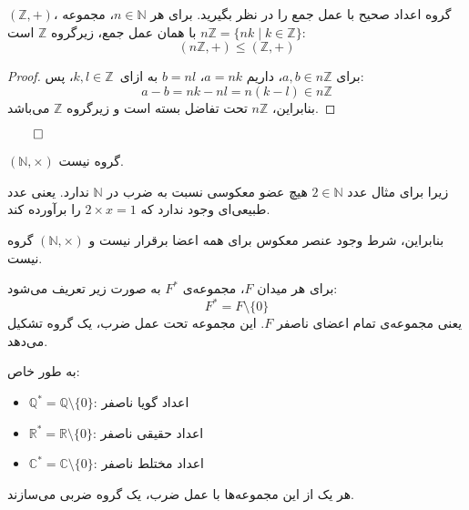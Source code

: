 \begin{frame}
    \begin{example}
        \( (\mathbb{Z}, +) \)، گروه اعداد صحیح با عمل جمع را در نظر بگیرید.
        برای هر \( n \in \mathbb{N} \)، مجموعه \( n\mathbb{Z} = \{ nk \mid k \in \mathbb{Z} \} \) با همان عمل جمع، زیرگروه \( \mathbb{Z} \) است:
        \[
            (n\mathbb{Z}, +) \leq (\mathbb{Z}, +)
        \]
    \end{example}

    \begin{proof}
        برای \( a, b \in n\mathbb{Z} \)، داریم \( a = nk \)، \( b = nl \)  به ازای \( k, l \in \mathbb{Z} \)، پس:
        \[
            a - b = nk - nl = n(k - l) \in n\mathbb{Z}
        \]
        بنابراین، \( n\mathbb{Z} \) تحت تفاضل بسته است و زیرگروه \( \mathbb{Z} \) می‌باشد.
    \end{proof}
    \hfill
    \(\qed\)
\end{frame}

\begin{frame}
    \begin{example}
        \( (\mathbb{N}, \times) \) گروه نیست.

        زیرا برای مثال عدد \( 2 \in \mathbb{N} \) هیچ عضو معکوسی نسبت به ضرب در \( \mathbb{N} \) ندارد.
        یعنی عدد طبیعی‌ای وجود ندارد که \( 2 \times x = 1 \) را برآورده کند.

        بنابراین، شرط وجود عنصر معکوس برای همه اعضا برقرار نیست و \( (\mathbb{N}, \times) \) گروه نیست.
    \end{example}


\end{frame}

\begin{frame}
    \begin{definition}
        برای هر میدان \( F \)، مجموعه‌ی \( F^* \) به صورت زیر تعریف می‌شود:
        \[
            F^* = F \setminus \{0\}
        \]
        یعنی مجموعه‌ی تمام اعضای ناصفر \( F \). این مجموعه تحت عمل ضرب، یک گروه تشکیل می‌دهد.

        به طور خاص:
        \begin{itemize}
            \item \( \mathbb{Q}^* = \mathbb{Q} \setminus \{0\} \): اعداد گویا ناصفر
            \item \( \mathbb{R}^* = \mathbb{R} \setminus \{0\} \): اعداد حقیقی ناصفر
            \item \( \mathbb{C}^* = \mathbb{C} \setminus \{0\} \): اعداد مختلط ناصفر
        \end{itemize}
        هر یک از این مجموعه‌ها با عمل ضرب، یک گروه ضربی می‌سازند.
    \end{definition}
\end{frame}

